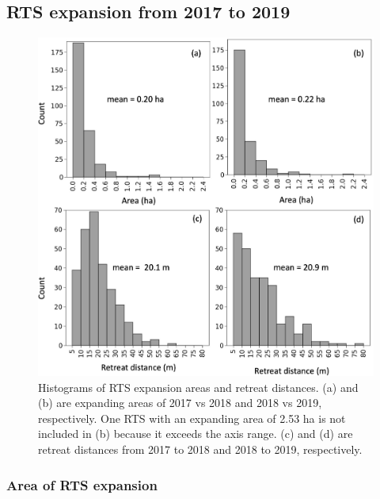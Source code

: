 \documentclass[authoryear,preprint,review,12pt]{elsarticle}
\begin{document}


\subsection{RTS expansion from 2017 to 2019}
\label{sec_rts_expanding}

\begin{figure} 
	\centering
	\includegraphics[width=14cm]{figs/rts_change_area_dis_manu_v2_trim.jpg}
	\caption{Histograms of RTS expansion areas and retreat distances. (a) and (b) are expanding areas of 2017 vs 2018 and 2018 vs 2019, respectively. One RTS with an expanding area of 2.53 ha is not included in (b) because it exceeds the axis range. (c) and (d) are retreat distances from 2017 to 2018 and 2018 to 2019, respectively.}
	\label{fig_rts_change_area_reDis}
\end{figure}

\subsubsection{Area of RTS expansion}
\label{sec_rts_change_area}
\end{document}
